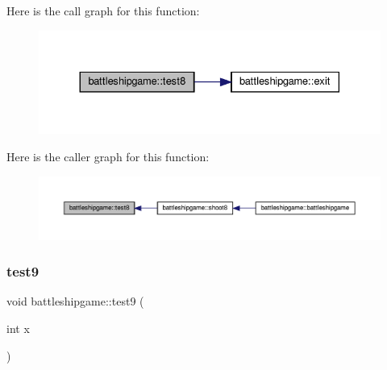 Here is the call graph for this function\+:
\nopagebreak
\begin{figure}[H]
\begin{center}
\leavevmode
\includegraphics[width=330pt]{classbattleshipgame_ad30b973cdaa9a48bea832d28e9c66a23_cgraph}
\end{center}
\end{figure}
Here is the caller graph for this function\+:
\nopagebreak
\begin{figure}[H]
\begin{center}
\leavevmode
\includegraphics[width=350pt]{classbattleshipgame_ad30b973cdaa9a48bea832d28e9c66a23_icgraph}
\end{center}
\end{figure}
\mbox{\label{classbattleshipgame_adcb72d849316cf91db67e2d40cf9757e}} 
\subsubsection{\texorpdfstring{test9}{test9}}
{\footnotesize\ttfamily void battleshipgame\+::test9 (\begin{DoxyParamCaption}\item[{int}]{x }\end{DoxyParamCaption})\hspace{0.3cm}{\ttfamily [slot]}}

